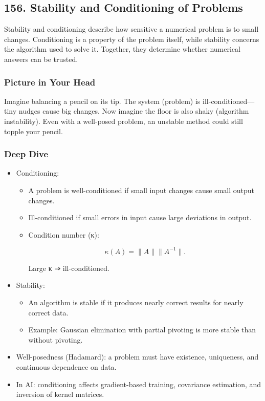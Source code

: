 \documentclass[
  letterpaper,
  DIV=11,
  numbers=noendperiod]{scrreprt}
\providecommand{\tightlist}{%
  \setlength{\itemsep}{0pt}\setlength{\parskip}{0pt}}
\begin{document}
\subsection{156. Stability and Conditioning of
Problems}\label{stability-and-conditioning-of-problems}

Stability and conditioning describe how sensitive a numerical problem is
to small changes. Conditioning is a property of the problem itself,
while stability concerns the algorithm used to solve it. Together, they
determine whether numerical answers can be trusted.

\subsubsection{Picture in Your Head}\label{picture-in-your-head-155}

Imagine balancing a pencil on its tip. The system (problem) is
ill-conditioned---tiny nudges cause big changes. Now imagine the floor
is also shaky (algorithm instability). Even with a well-posed problem,
an unstable method could still topple your pencil.

\subsubsection{Deep Dive}\label{deep-dive-155}

\begin{itemize}
\item
  Conditioning:

  \begin{itemize}
  \item
    A problem is well-conditioned if small input changes cause small
    output changes.
  \item
    Ill-conditioned if small errors in input cause large deviations in
    output.
  \item
    Condition number (κ):

    \[
    κ(A) = \|A\|\|A^{-1}\|.
    \]

    Large κ ⇒ ill-conditioned.
  \end{itemize}
\item
  Stability:

  \begin{itemize}
  \tightlist
  \item
    An algorithm is stable if it produces nearly correct results for
    nearly correct data.
  \item
    Example: Gaussian elimination with partial pivoting is more stable
    than without pivoting.
  \end{itemize}
\item
  Well-posedness (Hadamard): a problem must have existence, uniqueness,
  and continuous dependence on data.
\item
  In AI: conditioning affects gradient-based training, covariance
  estimation, and inversion of kernel matrices.
\end{itemize}
\end{document}
